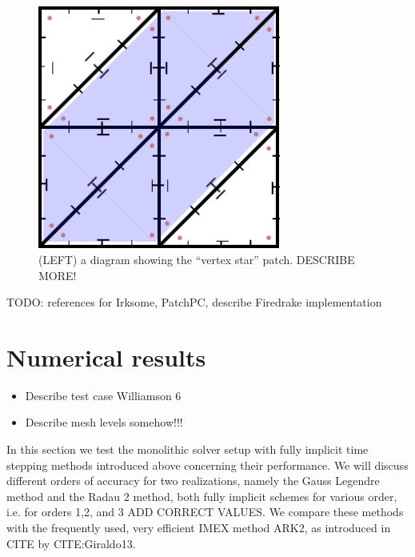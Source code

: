 \documentclass[a4paper, 12pt]{article}
\newcommand{\todo}[1]{\vspace{5 mm}\par \noindent
	\framebox{\begin{minipage}[c]{0.95 \textwidth}
			\tt #1 \end{minipage}}\vspace{5 mm}\par}
\newcommand{\checkit}[1]{{\color{red}#1}}
\begin{document}
 \begin{figure}
  \includegraphics[width=8cm]{Images/patch}
  \caption{\label{fig:patch} (LEFT) a diagram showing the ``vertex
    star'' patch. DESCRIBE MORE!}
 \end{figure}
 
TODO: references for Irksome, PatchPC, describe Firedrake implementation

\todo{
\begin{itemize}
 \item BDFM FE??
 \item
\end{itemize}
}









\cleardoublepage



\section{Numerical results}


\begin{itemize}
 \item Describe test case Williamson 6
 \item Describe mesh levels somehow!!!
\end{itemize}

In this section we test the monolithic solver setup with fully implicit time stepping methods introduced above concerning their performance. We will discuss different orders of accuracy for two realizations, namely the Gauss Legendre method and the Radau 2 method, both fully implicit schemes for various order, i.e. for orders 1,2, and 3 \checkit{ADD CORRECT VALUES.} We compare these methods with the frequently used, very efficient IMEX method ARK2, as introduced in CITE by CITE:Giraldo13.
\end{document}
